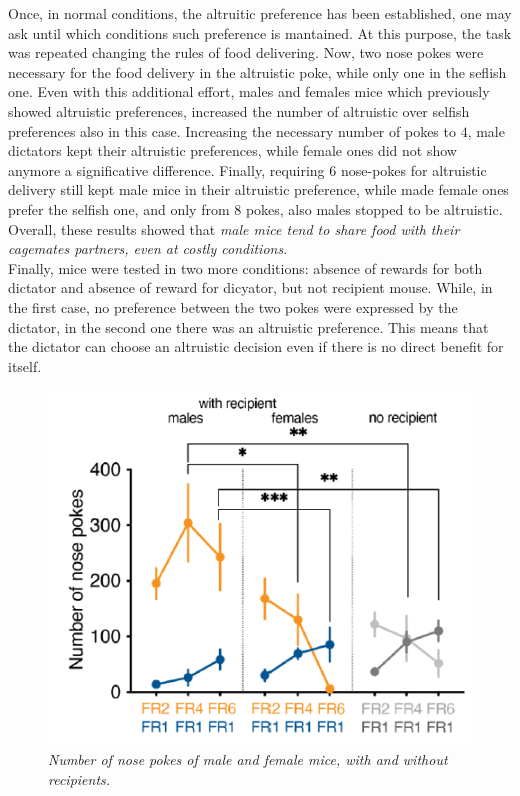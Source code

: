 \documentclass[a4paper]{article}
\begin{document}
Once, in normal conditions, the altruitic preference has been established, one may ask until which conditions such preference is mantained. At this purpose, the task was repeated changing the rules of food delivering. Now, two nose pokes were necessary for the food delivery in the altruistic poke, while only one in the seflish one. Even with this additional effort, males and females mice which previously showed altruistic preferences, increased the number of altruistic over selfish preferences also in this case. Increasing the necessary number of pokes to $4$, male dictators kept their altruistic preferences, while female ones did not show anymore a significative difference. Finally, requiring $6$ nose-pokes for altruistic delivery still kept male mice in their altruistic preference, while made female ones prefer the selfish one, and only from $8$ pokes, also males stopped to be altruistic. Overall, these results showed that \textit{male mice tend to share food with their cagemates partners, even at costly conditions}.\\
Finally, mice were tested in two more conditions: absence of rewards for both dictator and absence of reward for dicyator, but not recipient mouse. While, in the first case, no preference between the two pokes were expressed by the dictator, in the second one there was an altruistic preference. This means that the dictator can choose an altruistic decision even if there is no direct benefit for itself.


\begin{figure}[H]
	\begin{center}
		\includegraphics[scale=0.6]{number_pokes.png} 
	\end{center} 
	\caption{\textit{Number of nose pokes of male and female mice, with and without recipients.}}
	
\end{figure}
\end{document}
